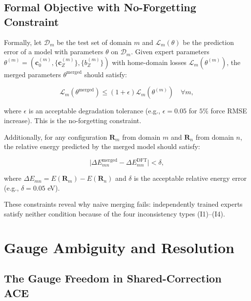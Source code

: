 \documentclass[twoside,prb,aps,floatfix,superscriptaddress,longbibliography]{revtex4-2}
\newcommand{\cZ}{\mathbf{c}_{Z}}
\newcommand{\cb}{\mathbf{c}_{0}}
\begin{document}
\subsection{Formal Objective with No-Forgetting Constraint}

Formally, let $\mathcal{D}_m$ be the test set of domain $m$ and $\mathcal{L}_m(\theta)$ be the prediction error of a model with parameters $\theta$ on $\mathcal{D}_m$. Given expert parameters $\theta^{(m)} = (\cb^{(m)}, \{\cZ^{(m)}\}, \{b_Z^{(m)}\})$ with home-domain losses $\mathcal{L}_m(\theta^{(m)})$, the merged parameters $\theta^{\mathrm{merged}}$ should satisfy:

\begin{equation}
\mathcal{L}_m(\theta^{\mathrm{merged}}) \le (1 + \epsilon) \mathcal{L}_m(\theta^{(m)}) \quad \forall m,
\label{eq:no_forget}
\end{equation}

where $\epsilon$ is an acceptable degradation tolerance (e.g., $\epsilon = 0.05$ for $5\%$ force RMSE increase). This is the no-forgetting constraint.

Additionally, for any configuration $\mathbf{R}_m$ from domain $m$ and $\mathbf{R}_n$ from domain $n$, the relative energy predicted by the merged model should satisfy:

\begin{equation}
\big| \Delta E_{mn}^{\mathrm{merged}} - \Delta E_{mn}^{\mathrm{DFT}} \big| < \delta,
\label{eq:relative_energy}
\end{equation}

where $\Delta E_{mn} = E(\mathbf{R}_m) - E(\mathbf{R}_n)$ and $\delta$ is the acceptable relative energy error (e.g., $\delta = 0.05$ eV).

These constraints reveal why naive merging fails: independently trained experts satisfy neither condition because of the four inconsistency types (I1)--(I4).

\section{Gauge Ambiguity and Resolution}
\label{sec:gauge}

\subsection{The Gauge Freedom in Shared-Correction ACE}
\end{document}

